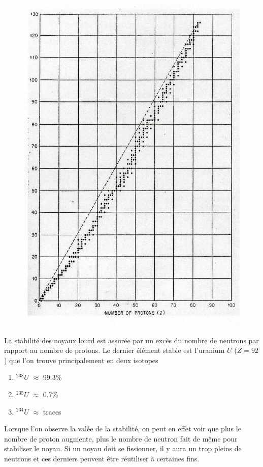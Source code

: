 	\begin{figure}
	\vspace{-5mm}
	\includegraphics[scale=0.1]{ch1/image1.png}
	\end{figure}
La stabilité des noyaux lourd est assurée par un excès du nombre de neutrons par rapport au 
nombre de protons. Le dernier élément stable est l'uranium $U$ ($Z=92$) que l'on trouve 
principalement en deux isotopes
\begin{enumerate}
\item $ ^{238}U$ $\approx$ 99.3\%
\item $ ^{235}U$ $\approx$ 0.7\%
\item $ ^{234}U$ $\approx$ traces
\end{enumerate}
Lorsque l'on observe la valée de la stabilité, on peut en effet voir que plus le nombre de 
proton augmente, plus le nombre de neutron fait de même pour stabiliser le noyau. Si un 
noyau doit se fissionner, il y aura un trop pleins de neutrons et ces derniers peuvent 
être réutiliser à certaines fins.\\ 
\\


